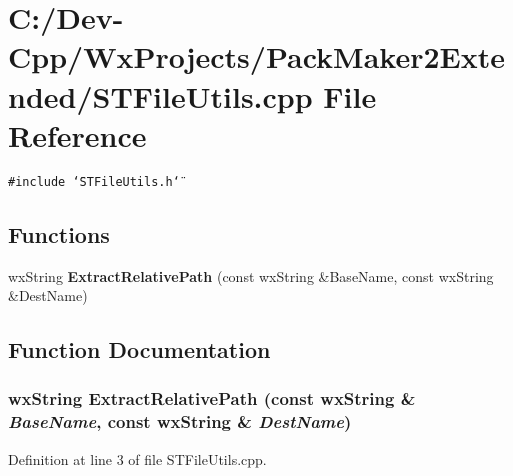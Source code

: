 \section{C:/Dev-Cpp/Wx\-Projects/Pack\-Maker2Extended/STFile\-Utils.cpp File Reference}
\label{_s_t_file_utils_8cpp}
{\tt \#include \char`\"{}STFile\-Utils.h\char`\"{}}\par
\subsection*{Functions}
\begin{CompactItemize}
\item 
wx\-String {\bf Extract\-Relative\-Path} (const wx\-String \&Base\-Name, const wx\-String \&Dest\-Name)
\end{CompactItemize}


\subsection{Function Documentation}
\subsubsection{\setlength{\rightskip}{0pt plus 5cm}wx\-String Extract\-Relative\-Path (const wx\-String \& {\em Base\-Name}, const wx\-String \& {\em Dest\-Name})}\label{_s_t_file_utils_8cpp_86b164e2bbd3ef593cccd50ed60e9fc4}




Definition at line 3 of file STFile\-Utils.cpp.